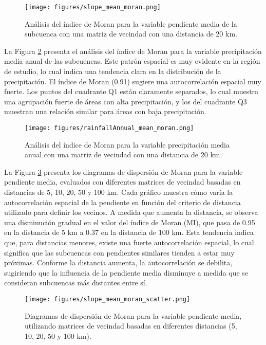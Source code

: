 \documentclass[
  manuscript=article,  
  layout=preprint,  
  year=2023,
  volume=0,
]{format}
\begin{document}
\begin{figure}[ht!]
    \centering
      {\texttt{[image: figures/slope\_mean\_moran.png]}}
\caption{Análisis del índice de Moran para la variable pendiente media de la subcuenca con una matriz de vecindad con una distancia de 20 km.}
    \label{fig:slope_moran}
\end{figure}

La Figura \ref{fig:rainfall_moran} presenta el análisis del índice de Moran para la variable precipitación media anual de las subcuencas. Este patrón espacial es muy evidente en la región de estudio, lo cual indica una tendencia clara en la distribución de la precipitación. El índice de Moran (0.91) sugiere una autocorrelación espacial muy fuerte. Los puntos del cuadrante Q1 están claramente separados, lo cual muestra una agrupación fuerte de áreas con alta precipitación, y los del cuadrante Q3 muestran una relación similar para áreas con baja precipitación.

\begin{figure}[ht!]
    \centering
      {\texttt{[image: figures/rainfallAnnual\_mean\_moran.png]}}
\caption{Análisis del índice de Moran para la variable precipitación media anual con una matriz de vecindad con una distancia de 20 km.}
    \label{fig:rainfall_moran}
\end{figure}

La Figura \ref{fig:slope_distance} presenta los diagramas de dispersión de Moran para la variable pendiente media, evaluados con diferentes matrices de vecindad basadas en distancias de 5, 10, 20, 50 y 100 km. Cada gráfico muestra cómo varía la autocorrelación espacial de la pendiente en función del criterio de distancia utilizado para definir los vecinos. A medida que aumenta la distancia, se observa una disminución gradual en el valor del índice de Moran (MI), que pasa de 0.95 en la distancia de 5 km a 0.37 en la distancia de 100 km. Esta tendencia indica que, para distancias menores, existe una fuerte autocorrelación espacial, lo cual significa que las subcuencas con pendientes similares tienden a estar muy próximas. Conforme la distancia aumenta, la autocorrelación se debilita, sugiriendo que la influencia de la pendiente media disminuye a medida que se consideran subcuencas más distantes entre sí.

\begin{figure}[ht!]
    \centering
      {\texttt{[image: figures/slope\_mean\_moran\_scatter.png]}}
\caption{Diagramas de dispersión de Moran para la variable pendiente media, utilizando matrices de vecindad basadas en diferentes distancias (5, 10, 20, 50 y 100 km).}
    \label{fig:slope_distance}
\end{figure}
\end{document}
